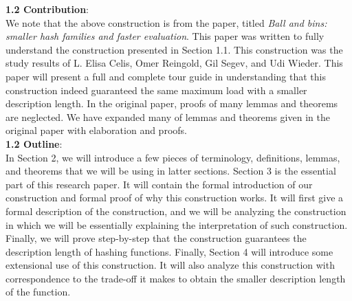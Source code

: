 \documentclass[letterpaper]{article} %
\begin{document}
	\noindent\textbf{1.2 Contribution}: \\
	We note that the above construction is from the paper, titled \textit{Ball and bins: smaller hash families and faster evaluation}. This paper was written to fully understand the construction presented in Section 1.1. This construction was the study results of L. Elisa Celis, Omer Reingold, Gil Segev, and Udi Wieder. This paper will present a full and complete tour guide in understanding that this construction indeed guaranteed the same maximum load with a smaller description length. In the original paper, proofs of many lemmas and theorems are neglected. We have expanded many of lemmas and theorems given in the original paper with elaboration and proofs. \\
		
	\noindent\textbf{1.2 Outline}: \\
	In Section 2, we will introduce a few pieces of terminology, definitions, lemmas, and theorems that we will be using in latter sections. Section 3 is the essential part of this research paper. It will contain the formal introduction of our construction and formal proof of why this construction works. It will first give a formal description of the construction, and we will be analyzing the construction in which we will be essentially explaining the interpretation of such construction. Finally, we will prove step-by-step that the construction guarantees the description length of hashing functions. Finally, Section 4 will introduce some extensional use of this construction. It will also analyze this construction with correspondence to the trade-off it makes to obtain the smaller description length of the function. \\\\
	
	
	\newpage
\end{document}
